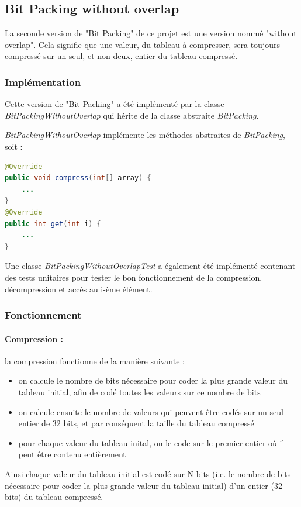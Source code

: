 \documentclass[titlepage]{article}
\begin{document}
\subsection{Bit Packing without overlap}

La seconde version de "Bit Packing" de ce projet est une version nommé "without overlap". Cela signifie que une valeur, du tableau à compresser, sera toujours compressé sur un seul, et non deux, entier du tableau compressé.


\subsubsection{Implémentation}

Cette version de "Bit Packing" a été implémenté par la classe \textsl{BitPackingWithoutOverlap} qui hérite de la classe abstraite \textsl{BitPacking}.
\par \textsl{BitPackingWithoutOverlap} implémente les méthodes abstraites de \textsl{BitPacking}, soit :
\begin{lstlisting}[language=Java]
@Override
public void compress(int[] array) {
	...
}
@Override
public int get(int i) {
	...
}
\end{lstlisting}
\par Une classe \textsl{BitPackingWithoutOverlapTest} a également été implémenté contenant des tests unitaires pour tester le bon fonctionnement de la compression, décompression et accès au i-ème élément.


\subsubsection{Fonctionnement}

\paragraph{Compression :} la compression fonctionne de la manière suivante :
\begin{itemize}
\item on calcule le nombre de bits nécessaire pour coder la plus grande valeur du tableau initial, afin de codé toutes les valeurs sur ce nombre de bits
\item on calcule ensuite le nombre de valeurs qui peuvent être codés sur un seul entier de 32 bits, et par conséquent la taille du tableau compressé
\item pour chaque valeur du tableau inital, on le code sur le premier entier où il peut être contenu entièrement
\end{itemize}
\par Ainsi chaque valeur du tableau initial est codé sur N bits (i.e. le nombre de bits nécessaire pour coder la plus grande valeur du tableau initial) d'un entier (32 bits) du tableau compressé.
\end{document}
